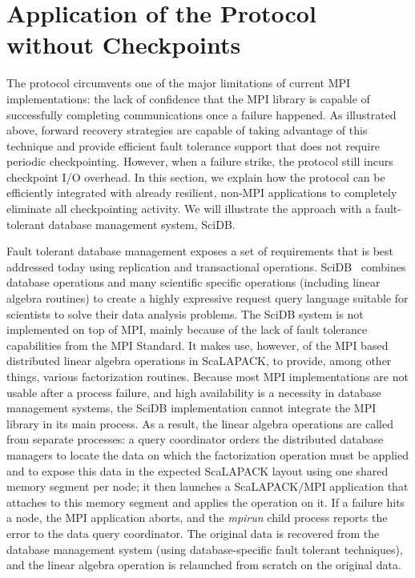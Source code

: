 \section{Application of the \cof Protocol without Checkpoints\label{section:application}}

The \cof protocol circumvents one of the major limitations of current
MPI implementations: the lack of confidence that the MPI library is capable of
successfully completing communications once a failure happened. As illustrated
above, forward recovery strategies are
capable of taking advantage of this technique and provide efficient fault
tolerance support that does not require periodic checkpointing.
However, when a failure strike, the \cof protocol still incurs 
checkpoint I/O overhead. 
In this section, we explain how the \cof protocol can be efficiently integrated
with already resilient, non-MPI applications to completely eliminate 
all checkpointing activity. We will illustrate the approach with a 
fault-tolerant database management system, SciDB.

Fault tolerant database management exposes a set of requirements that is best
addressed today using replication and transactional operations.
SciDB~\cite{scidbwhitepaper} combines database operations and many scientific
specific operations (including linear algebra routines) to create a highly
expressive request query language suitable for scientists to solve their data
analysis problems. The SciDB system is not implemented on top of MPI, 
mainly because of the lack of fault tolerance capabilities from
the MPI Standard. It makes use, however, of the MPI based
distributed linear algebra operations in ScaLAPACK, to provide, among other
things, various factorization routines. Because most MPI implementations are not
usable after a process failure, and high availability is a necessity in database
management systems, the SciDB implementation cannot integrate the MPI library in
its main process. As a result, the linear algebra operations are called 
from separate processes: a query coordinator orders the distributed database
managers to locate the data on which the factorization operation must be
applied and to expose this data in the expected ScaLAPACK layout using one
shared memory segment per node; it then launches a ScaLAPACK/MPI application
that attaches to this memory segment and applies the operation on it. If a
failure hits a node, the MPI application aborts, and the {\it mpirun} child
process reports the error to the data query coordinator. The original data is
recovered from the database management system (using database-specific fault
tolerant techniques), and the linear algebra operation is relaunched from scratch
on the original data.


